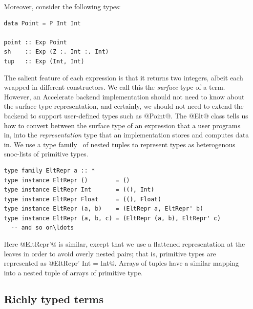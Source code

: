 Moreover, consider the following types:
%
\begin{lstlisting}[style=haskell]
data Point = P Int Int

point :: Exp Point
sh    :: Exp (Z :. Int :. Int)
tup   :: Exp (Int, Int)
\end{lstlisting}
%
The salient feature of each expression is that it returns two integers, albeit
each wrapped in different constructors. We call this the \emph{surface} type
of a term. However, an Accelerate backend implementation should not need to know
about the surface type representation, and certainly, we should not need to
extend the backend to support user-defined types such as @Point@. The @Elt@
class tells us how to convert between the surface type of an expression that a
user programs in, into the \emph{representation} type that an implementation
stores and computes data in. We use a type
family~\cite{Chakravarty:2005dx,Schrijvers:2008ir} of nested tuples to represent
types as heterogenous snoc-lists of primitive types.
%
\begin{lstlisting}[style=haskell]
type family EltRepr a :: *
type instance EltRepr ()        = ()
type instance EltRepr Int       = ((), Int)
type instance EltRepr Float     = ((), Float)
type instance EltRepr (a, b)    = (EltRepr a, EltRepr' b)
type instance EltRepr (a, b, c) = (EltRepr (a, b), EltRepr' c)
  -- and so on\ldots
\end{lstlisting}
%
Here @EltRepr'@ is similar, except that we use a flattened representation at the
leaves in order to avoid overly nested pairs; that is, primitive types are
represented as @EltRepr' Int = Int@. Arrays of tuples have a similar mapping
into a nested tuple of arrays of primitive type.


\subsection{Richly typed terms}

